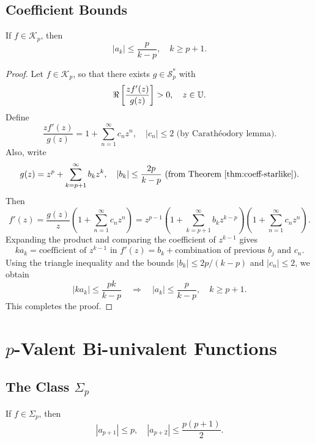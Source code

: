 \subsection{Coefficient Bounds}

\begin{theorem}
	If $f \in \mathcal{K}_p$, then
	\[
	|a_k| \le \frac{p}{k-p}, \quad k \ge p+1.
	\]
\end{theorem}

\begin{proof}
	Let $f \in \mathcal{K}_p$, so that there exists $g \in \mathcal{S}_p^*$ with
	\[
	\Re\left[\frac{z f'(z)}{g(z)}\right] > 0, \quad z \in \mathbb{U}.
	\]
	Define
	\[
	\frac{z f'(z)}{g(z)} = 1 + \sum_{n=1}^{\infty} c_n z^n, \quad |c_n| \le 2 \text{ (by Carathéodory lemma).}
	\]
	Also, write
	\[
	g(z) = z^p + \sum_{k=p+1}^{\infty} b_k z^k, \quad |b_k| \le \frac{2p}{k-p} \text{ (from Theorem~\ref{thm:coeff-starlike}).}
	\]
	Then
	\[
	f'(z) = \frac{g(z)}{z} \left(1 + \sum_{n=1}^{\infty} c_n z^n\right) = z^{p-1}\left(1 + \sum_{k=p+1}^{\infty} b_k z^{k-p}\right)\left(1 + \sum_{n=1}^{\infty} c_n z^n\right).
	\]
	Expanding the product and comparing the coefficient of $z^{k-1}$ gives
	\[
	k a_k = \text{coefficient of } z^{k-1} \text{ in } f'(z) = b_k + \text{combination of previous } b_j \text{ and } c_n.
	\]
	Using the triangle inequality and the bounds $|b_k| \le 2p/(k-p)$ and $|c_n| \le 2$, we obtain
	\[
	|k a_k| \le \frac{p k}{k-p} \quad \Rightarrow \quad |a_k| \le \frac{p}{k-p}, \quad k \ge p+1.
	\]
	This completes the proof.
\end{proof}


\section{$p$-Valent Bi-univalent Functions}

\subsection{The Class $\Sigma_p$}

\begin{theorem}
	If $f \in \Sigma_p$, then
	\[
	|a_{p+1}| \le p, \quad |a_{p+2}| \le \frac{p(p+1)}{2}.
	\]
\end{theorem}


